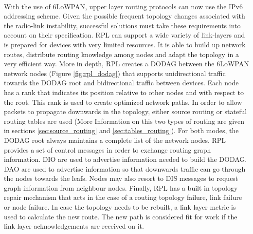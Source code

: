 \paragraph{}
With the use of 6LoWPAN, upper layer routing protocols can now use the IPv6 addressing scheme. Given the possible frequent topology changes associated with the radio-link instability, successful  solutions must take these requirements into account on their specification. \ac{RPL} \cite{Winter2012} can support a wide variety of link-layers and is prepared for devices with very limited resources. It is able to build up network routes, distribute routing knowledge among nodes and adapt the topology in a very efficient way. More in depth, \ac{RPL} creates a \ac{DODAG} between the 6LoWPAN network nodes (Figure \ref{fig:rpl_dodag}) that supports unidirectional traffic towards the \ac{DODAG} root and bidirectional traffic between devices. Each node has a rank that indicates its position relative to other nodes and with respect to the root. This rank is used to create optimized network paths. In order to allow packets to propagate downwards in the topology, either source routing or stateful routing tables are used (More Information on this two types of routing are given in sections \ref{sec:source_routing} and \ref{sec:tables_routing}). For both modes, the \ac{DODAG} root always maintains a complete list of the network nodes. \ac{RPL} provides a set of control messages in order to exchange routing graph information. \ac{DIO} are used to advertise information needed to build the \ac{DODAG}. \ac{DAO}  are used to advertise information so that downwards traffic can go through the nodes towards the leafs. Nodes may also resort to \ac{DIS} messages to request graph information from neighbour nodes. Finally, RPL has a built in topology repair mechanism that acts in the case of a routing topology failure, link failure or node failure. In case the topology needs to be rebuilt, a link layer metric is used to calculate the new route. The new path is considered fit for work if the link layer acknowledgements are received on it.

